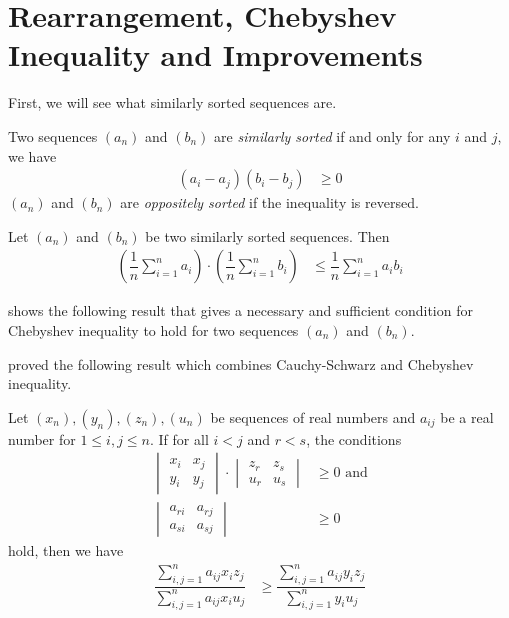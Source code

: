\documentclass{subfile}
\begin{document}
	\section{Rearrangement, Chebyshev Inequality and Improvements}\label{sec:rearragement}
	First, we will see what similarly sorted sequences are.
		\begin{definition}
			Two sequences $(a_n)$ and $(b_n)$ are \textit{similarly sorted} if and only for any $i$ and $j$, we have
				\begin{align*}
					(a_i-a_j)(b_i-b_j)
						& \geq0
				\end{align*}
			$(a_n)$ and $(b_n)$ are \textit{oppositely sorted} if the inequality is reversed.
		\end{definition}
	
		\begin{theorem}
			Let $(a_n)$ and $(b_n)$ be two similarly sorted sequences. Then
				\begin{align*}
					\left(\dfrac{1}{n}\sum_{i=1}^na_i\right)\cdot\left(\dfrac{1}{n}\sum_{i=1}^nb_i\right)
						& \leq\dfrac{1}{n}\sum_{i=1}^na_ib_i
				\end{align*}
		\end{theorem}
	\textcite{SASSER1967} shows the following result that gives a necessary and sufficient condition for Chebyshev inequality to hold for two sequences $(a_n)$ and $(b_n)$.
		\begin{theorem}
			
		\end{theorem}
	\textcite{Seitz1936} proved the following result which combines Cauchy-Schwarz and Chebyshev inequality.
		\begin{theorem}
			Let $(x_n),(y_n),(z_n),(u_n)$ be sequences of real numbers and $a_{ij}$ be a real number for $1\leq i,j\leq n$. If for all $i<j$ and $r<s$, the conditions
				\begin{align*}
					\begin{vmatrix}
						x_i & x_j\\
						y_i & y_j
					\end{vmatrix}\cdot
					\begin{vmatrix}
						z_r & z_s\\
						u_r & u_s
					\end{vmatrix}
						& \geq0\mbox{ and}\\
					\begin{vmatrix}
						a_{ri} & a_{rj}\\
						a_{si} & a_{sj}
					\end{vmatrix}
						& \geq0
				\end{align*}
			hold, then we have
				\begin{align*}
					\dfrac{\sum_{i,j=1}^na_{ij}x_iz_j}{\sum_{i,j=1}^na_{ij}x_iu_j}
						& \geq\dfrac{\sum_{i,j=1}^na_{ij}y_iz_j}{\sum_{i,j=1}^ny_iu_j}
				\end{align*}
		\end{theorem}
\end{document}
